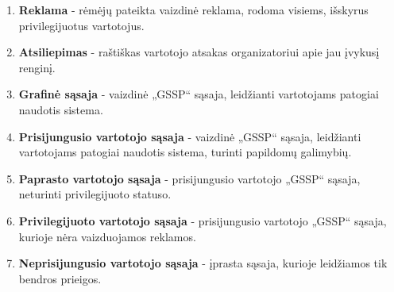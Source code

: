 \documentclass{VUMIFPSkursinis}
\begin{document}
\begin{enumerate}[label=\textbf{E\arabic*.}]
				\item \textbf{Reklama} - rėmėjų pateikta vaizdinė reklama, rodoma visiems, išskyrus privilegijuotus vartotojus.
				\item \textbf{Atsiliepimas} - raštiškas vartotojo atsakas organizatoriui apie jau įvykusį renginį.
				\item \textbf{Grafinė sąsaja} - vaizdinė „GSSP“ sąsaja, leidžianti vartotojams patogiai naudotis sistema.
				\item \textbf{Prisijungusio vartotojo sąsaja} - vaizdinė „GSSP“ sąsaja, leidžianti vartotojams patogiai naudotis sistema, turinti papildomų galimybių.
				\item \textbf{Paprasto vartotojo sąsaja} - prisijungusio vartotojo „GSSP“ sąsaja, neturinti privilegijuoto statuso.
				\item \textbf{Privilegijuoto vartotojo sąsaja} - prisijungusio vartotojo „GSSP“ sąsaja, kurioje nėra vaizduojamos reklamos.
				\item \textbf{Neprisijungusio vartotojo sąsaja} - įprasta sąsaja, kurioje leidžiamos tik bendros prieigos.	
            \end{enumerate}
\end{document}
